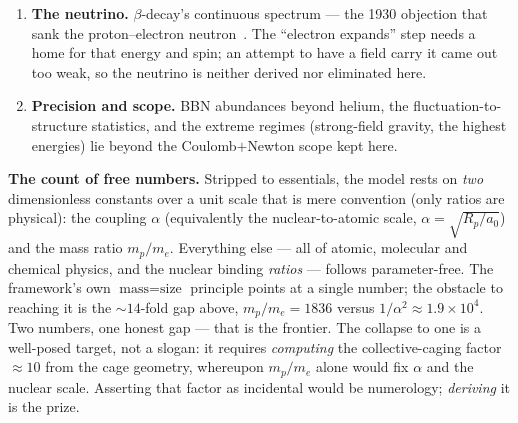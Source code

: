 \documentclass[11pt]{article}
\begin{document}
\begin{enumerate}
logic --- mass \emph{is} size ($\text{small}=\text{heavy}$, $E/c^2$) --- one would expect the mass ratio to set
the electron/nucleus \emph{size} ratio, giving a single physical number. It does not. The mass ratio implies a
nuclear size $a_0/(m_p/m_e)\approx29$ fm, whereas the actual scale is ${\sim}2$--$3$ fm ($r_e=\alpha^2a_0=2.8$
fm); equivalently the size ratio $a_0/R_p\approx2.5\times10^4$ ($\approx1/\alpha^2$) exceeds $m_p/m_e=1836$ by a
factor ${\sim}14$. The nucleus is that much \emph{more compact} than the naive size--mass law allows --- because
the caged electron is flat (zero localisation), held collectively by several protons. \textbf{Deriving that
factor} --- showing the collective flat-caging compacts the electron by exactly this amount --- would make
$m_p/m_e$ fix the nuclear scale, hence $\alpha$, and collapse the two numbers into one. That derivation is missing;
the gap $1836\neq1/\alpha^2$ is the single unsolved step between two numbers and one.
\item \textbf{The neutrino.} $\beta$-decay's continuous spectrum --- the 1930 objection that sank the
proton--electron neutron~\cite{pauli}. The ``electron expands'' step needs a home for that energy and spin; an
attempt to have a field carry it came out too weak, so the neutrino is neither derived nor eliminated here.
\item \textbf{Precision and scope.} BBN abundances beyond helium, the fluctuation-to-structure statistics, and the
extreme regimes (strong-field gravity, the highest energies) lie beyond the Coulomb$+$Newton scope kept here.
\end{enumerate}

\noindent\textbf{The count of free numbers.} Stripped to essentials, the model rests on \emph{two} dimensionless
constants over a unit scale that is mere convention (only ratios are physical): the coupling $\alpha$ (equivalently
the nuclear-to-atomic scale, $\alpha=\sqrt{R_p/a_0}$) and the mass ratio $m_p/m_e$. Everything else --- all of
atomic, molecular and chemical physics, and the nuclear binding \emph{ratios} --- follows parameter-free. The
framework's own $\text{mass}=\text{size}$ principle points at a single number; the obstacle to reaching it is the
${\sim}14$-fold gap above, $m_p/m_e=1836$ versus $1/\alpha^2\approx1.9\times10^4$. Two numbers, one honest gap ---
that is the frontier. The collapse to one is a well-posed target, not a slogan: it requires \emph{computing} the
collective-caging factor ${\approx}10$ from the cage geometry, whereupon $m_p/m_e$ alone would fix $\alpha$ and the
nuclear scale. Asserting that factor as incidental would be numerology; \emph{deriving} it is the prize.
\end{document}

